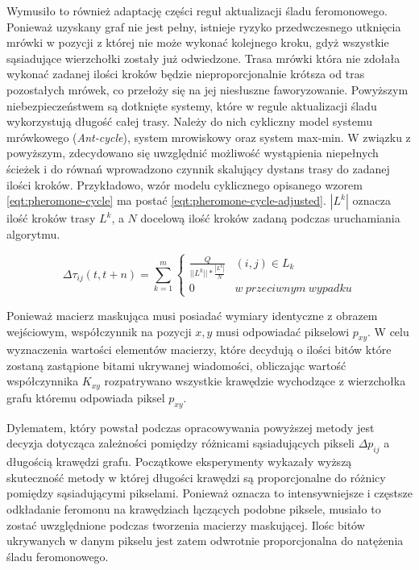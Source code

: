 {{{            Wymusiło to również adaptację części reguł aktualizacji śladu feromonowego. Ponieważ uzyskany graf nie jest
            pełny, istnieje ryzyko przedwczesnego utknięcia mrówki w pozycji z której nie może wykonać kolejnego kroku,
            gdyż wszystkie sąsiadujące wierzchołki zostały już odwiedzone. Trasa mrówki która nie zdołała wykonać
            zadanej ilości kroków będzie nieproporcjonalnie krótsza od tras pozostałych mrówek, co przełoży się na jej
            niesłuszne faworyzowanie. Powyższym niebezpieczeństwem są dotknięte systemy, które w regule aktualizacji
            śladu wykorzystują długość całej trasy. Należy do nich cykliczny model systemu mrówkowego
            (\textit{Ant-cycle}), system mrowiskowy oraz system max-min. W związku z powyższym, zdecydowano się
            uwzględnić możliwość wystąpienia niepełnych ścieżek i do równań wprowadzono czynnik skalujący dystans trasy
            do zadanej ilości kroków. Przykładowo, wzór modelu cyklicznego opisanego wzorem \ref{eqt:pheromone-cycle} ma
            postać \ref{eqt:pheromone-cycle-adjusted}. $|L^k|$ oznacza ilość kroków trasy $L^k$, a $N$ docelową ilość
            kroków zadaną podczas uruchamiania algorytmu.

            \begin{equation}\label{eqt:pheromone-cycle-adjusted}
                \Delta\tau_{ij}(t, t + n) = \sum_{k=1}^m \left\{
                        \begin{matrix}
                            \frac{Q}{||L^k|| * \frac{|L^k|}{N}} & (i, j) \in L_k\\
                            0 & w\ przeciwnym\ wypadku
                        \end{matrix}
                    \right.
            \end{equation}

            Ponieważ macierz maskująca musi posiadać wymiary identyczne z obrazem wejściowym, współczynnik na pozycji
            $x, y$ musi odpowiadać pikselowi $p_{xy}$. W celu wyznaczenia wartości elementów macierzy, które decydują o
            ilości bitów które zostaną zastąpione bitami ukrywanej wiadomości, obliczając wartość współczynnika $K_{xy}$
            rozpatrywano wszystkie krawędzie wychodzące z wierzchołka grafu któremu odpowiada piksel $p_{xy}$.

            Dylematem, który powstał podczas opracowywania powyższej metody jest decyzja dotycząca zależności pomiędzy
            różnicami sąsiadujących pikseli $\Delta p_{ij}$ a długością krawędzi grafu. Początkowe eksperymenty wykazały
            wyższą skuteczność metody w której długości krawędzi są proporcjonalne do różnicy pomiędzy sąsiadującymi
            pikselami. Ponieważ oznacza to intensywniejsze i częstsze odkładanie feromonu na krawędziach łączących
            podobne piksele, musiało to zostać uwzględnione podczas tworzenia macierzy maskującej. Ilośc bitów
            ukrywanych w danym pikselu jest zatem odwrotnie proporcjonalna do natężenia śladu feromonowego.

}}}
